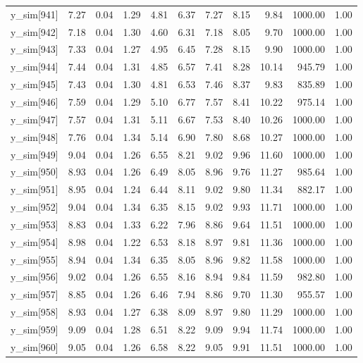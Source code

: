 \begin{table}[ht]
\begin{tabular}{rrrrrrrrrrr}
  y\_sim[941] & 7.27 & 0.04 & 1.29 & 4.81 & 6.37 & 7.27 & 8.15 & 9.84 & 1000.00 & 1.00 \\ 
  y\_sim[942] & 7.18 & 0.04 & 1.30 & 4.60 & 6.31 & 7.18 & 8.05 & 9.70 & 1000.00 & 1.00 \\ 
  y\_sim[943] & 7.33 & 0.04 & 1.27 & 4.95 & 6.45 & 7.28 & 8.15 & 9.90 & 1000.00 & 1.00 \\ 
  y\_sim[944] & 7.44 & 0.04 & 1.31 & 4.85 & 6.57 & 7.41 & 8.28 & 10.14 & 945.79 & 1.00 \\ 
  y\_sim[945] & 7.43 & 0.04 & 1.30 & 4.81 & 6.53 & 7.46 & 8.37 & 9.83 & 835.89 & 1.00 \\ 
  y\_sim[946] & 7.59 & 0.04 & 1.29 & 5.10 & 6.77 & 7.57 & 8.41 & 10.22 & 975.14 & 1.00 \\ 
  y\_sim[947] & 7.57 & 0.04 & 1.31 & 5.11 & 6.67 & 7.53 & 8.40 & 10.26 & 1000.00 & 1.00 \\ 
  y\_sim[948] & 7.76 & 0.04 & 1.34 & 5.14 & 6.90 & 7.80 & 8.68 & 10.27 & 1000.00 & 1.00 \\ 
  y\_sim[949] & 9.04 & 0.04 & 1.26 & 6.55 & 8.21 & 9.02 & 9.96 & 11.60 & 1000.00 & 1.00 \\ 
  y\_sim[950] & 8.93 & 0.04 & 1.26 & 6.49 & 8.05 & 8.96 & 9.76 & 11.27 & 985.64 & 1.00 \\ 
  y\_sim[951] & 8.95 & 0.04 & 1.24 & 6.44 & 8.11 & 9.02 & 9.80 & 11.34 & 882.17 & 1.00 \\ 
  y\_sim[952] & 9.04 & 0.04 & 1.34 & 6.35 & 8.15 & 9.02 & 9.93 & 11.71 & 1000.00 & 1.00 \\ 
  y\_sim[953] & 8.83 & 0.04 & 1.33 & 6.22 & 7.96 & 8.86 & 9.64 & 11.51 & 1000.00 & 1.00 \\ 
  y\_sim[954] & 8.98 & 0.04 & 1.22 & 6.53 & 8.18 & 8.97 & 9.81 & 11.36 & 1000.00 & 1.00 \\ 
  y\_sim[955] & 8.94 & 0.04 & 1.34 & 6.35 & 8.05 & 8.96 & 9.82 & 11.58 & 1000.00 & 1.00 \\ 
  y\_sim[956] & 9.02 & 0.04 & 1.26 & 6.55 & 8.16 & 8.94 & 9.84 & 11.59 & 982.80 & 1.00 \\ 
  y\_sim[957] & 8.85 & 0.04 & 1.26 & 6.46 & 7.94 & 8.86 & 9.70 & 11.30 & 955.57 & 1.00 \\ 
  y\_sim[958] & 8.93 & 0.04 & 1.27 & 6.38 & 8.09 & 8.97 & 9.80 & 11.29 & 1000.00 & 1.00 \\ 
  y\_sim[959] & 9.09 & 0.04 & 1.28 & 6.51 & 8.22 & 9.09 & 9.94 & 11.74 & 1000.00 & 1.00 \\ 
  y\_sim[960] & 9.05 & 0.04 & 1.26 & 6.58 & 8.22 & 9.05 & 9.91 & 11.51 & 1000.00 & 1.00 \\ 

\end{tabular}
\end{table}

